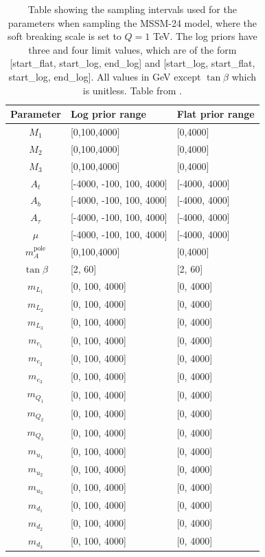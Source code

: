\documentclass[twoside,english]{uiofysmaster}
\begin{document}
\begin{table}
\centering
\begin{tabular}{cll}
\hline
Parameter & Log prior range & Flat prior range\\
\hline
$M_1$ & [0,100,4000] & [0,4000]\\
$M_2$ & [0,100,4000] & [0,4000]\\
$M_3$ & [0,100,4000] & [0,4000]\\
$A_t$ & [-4000, -100, 100, 4000] & [-4000, 4000]\\
$A_b$ & [-4000, -100, 100, 4000] & [-4000, 4000]\\
$A_{\tau}$ & [-4000, -100, 100, 4000] & [-4000, 4000]\\
$\mu$ & [-4000, -100, 100, 4000] & [-4000, 4000]\\
$m_A^{\text{pole}}$ & [0,100,4000] & [0,4000]\\
$\tan \beta$ & [2, 60] & [2, 60]\\
$m_{L_1}$ & [0, 100, 4000] & [0, 4000]\\
$m_{L_2}$ & [0, 100, 4000] & [0, 4000]\\
$m_{L_3}$ & [0, 100, 4000] & [0, 4000]\\
$m_{e_1}$ & [0, 100, 4000] & [0, 4000]\\
$m_{e_2}$ & [0, 100, 4000] & [0, 4000]\\
$m_{e_3}$ & [0, 100, 4000] & [0, 4000]\\
$m_{Q_1}$ & [0, 100, 4000] & [0, 4000]\\
$m_{Q_2}$ & [0, 100, 4000] & [0, 4000]\\
$m_{Q_3}$ & [0, 100, 4000] & [0, 4000]\\
$m_{u_1}$ & [0, 100, 4000] & [0, 4000]\\
$m_{u_2}$ & [0, 100, 4000] & [0, 4000]\\
$m_{u_3}$ & [0, 100, 4000] & [0, 4000]\\
$m_{d_1}$ & [0, 100, 4000] & [0, 4000]\\
$m_{d_2}$ & [0, 100, 4000] & [0, 4000]\\
$m_{d_3}$ & [0, 100, 4000] & [0, 4000]\\
\end{tabular}
\caption{Table showing the sampling intervals used for the parameters when sampling the MSSM-24 model, where the soft breaking scale is set to $Q = 1$ TeV. The log priors have three and four limit values, which are of the form [start\_flat, start\_log, end\_log] and [start\_log, start\_flat, start\_log, end\_log]. All values in GeV except $\tan \beta$ which is unitless. Table from \cite{sparre2018fast}.}
\label{Tab:: evalualting cross : Feature distributions }
\end{table}
\end{document}
